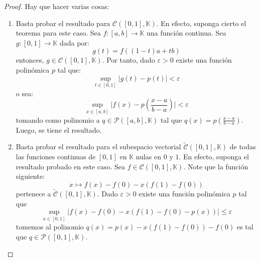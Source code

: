\documentclass[12pt]{report}
\theoremstyle{largebreak}
\newcommand\cf[3]{\ensuremath{#1:#2\rightarrow#3}}
\newcommand\abs[1]{\ensuremath{\big|#1\big|}}
\begin{document}
    \begin{proof}
        Hay que hacer varias cosas:
        \begin{enumerate}
            \item Basta probar el resultado para $\mathcal{C}([0,1],\mathbb{K})$. En efecto, suponga cierto el teorema para este caso. Sea $\cf{f}{[a,b]}{\mathbb{K}}$ una función continua. Sea $\cf{g}{[0,1]}{\mathbb{K}}$ dada por:
            \begin{equation*}
                g(t)=f((1-t)a+tb)
            \end{equation*}
            entonces, $g\in\mathcal{C}([0,1],\mathbb{K})$. Por tanto, dado $\varepsilon>0$ existe una función polinómica $p$ tal que:
            \begin{equation*}
                \sup_{t\in[0,1]}\abs{g(t)-p(t)}<\varepsilon
            \end{equation*}
            o sea:
            \begin{equation*}
                \sup_{x\in[a,b]}\abs{f(x)-p\left(\frac{x-a}{b-a} \right)}<\varepsilon
            \end{equation*}
            tomando como polinomio a $q\in\mathcal{P}([a,b],\mathbb{K})$ tal que $q(x)=p(\frac{x-a}{b-a})$. Luego, se tiene el resultado.

            \item Basta probar el resultado para el subespacio vectorial $\widetilde{\mathcal{C}}([0,1],\mathbb{K})$ de todas las funciones continuas de $[0,1]$ en $\mathbb{K}$ nulas en $0$ y $1$. En efecto, suponga el resultado probado en este caso. Sea $f\in\mathcal{C}([0,1],\mathbb{K})$. Note que la función siguiente:
            \begin{equation*}
                x\mapsto f(x)-f(0)-x(f(1)-f(0))
            \end{equation*}
            pertenece a $\widetilde{\mathcal{C}}([0,1],\mathbb{K})$. Dado $\varepsilon>0$ existe una función polinómica $p$ tal que
            \begin{equation*}
                \sup_{x\in[0,1]}\abs{f(x)-f(0)-x(f(1)-f(0)-p(x))}\leq\varepsilon
            \end{equation*}
            tomemos al polinomio $q(x)=p(x)-x(f(1)-f(0))-f(0)$ es tal que $q\in\mathcal{P}([0,1],\mathbb{K})$.


\end{enumerate}
\end{proof}
\end{document}
